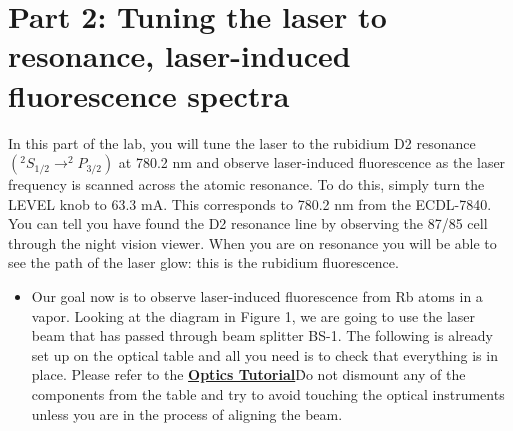 \documentclass{../lab}
\begin{document}
\section{Part 2: Tuning the laser to resonance, laser-induced fluorescence spectra}

In this part of the lab, you will tune the laser to the rubidium D2 resonance $( ^2S_{1/2}\rightarrow^2P_{3/2})$  at 780.2 nm and observe laser-induced fluorescence as the laser frequency is scanned across the atomic resonance. To do this, simply turn the LEVEL knob to 63.3 mA. This corresponds to 780.2 nm from the ECDL-7840. You can tell you have found the D2 resonance line by observing the 87/85 cell through the night vision viewer. When you are on resonance you will be able to see the path of the laser glow: this is the rubidium fluorescence.

\begin{itemize}
    \item Our goal now is to observe laser-induced fluorescence from Rb atoms in a vapor. Looking at the diagram in Figure 1, we are going to use the laser beam that has passed through beam splitter BS-1. The following is already set up on the optical table and all you need is to check that everything is in place. Please refer to the \href{http://experimentationlab.berkeley.edu/OpticsTutorial}{\textbf{Optics Tutorial}}\. Do not dismount any of the components from the table and try to avoid touching the optical instruments unless you are in the process of aligning the beam.

\end{itemize}
\end{document}
